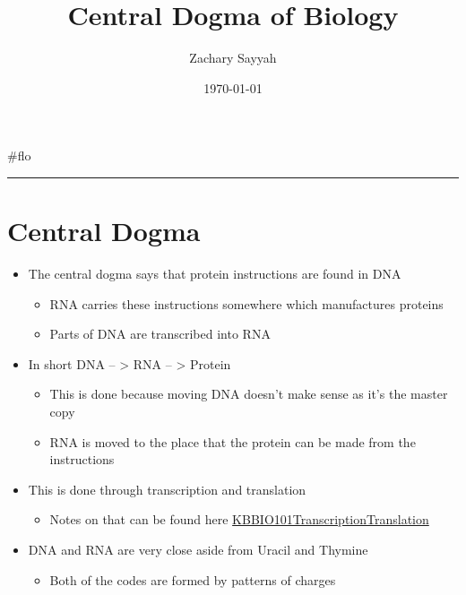 \documentclass[letterpaper]{article}
\author{Zachary Sayyah}
\date{\today}
\title{Central Dogma of Biology}
\renewcommand\maketitle{}
\begin{document}
\maketitle
\#flo

\noindent\rule{\textwidth}{0.5pt}

\section{Central Dogma}
\label{sec:orgae98e0f}
\begin{itemize}
\item The central dogma says that protein instructions are found in DNA

\begin{itemize}
\item RNA carries these instructions somewhere which manufactures proteins
\item Parts of DNA are transcribed into RNA
\end{itemize}

\item In short DNA -- > RNA -- > Protein

\begin{itemize}
\item This is done because moving DNA doesn't make sense as it's the
master copy
\item RNA is moved to the place that the protein can be made from the
instructions
\end{itemize}

\item This is done through transcription and translation

\begin{itemize}
\item Notes on that can be found here
\href{KBBIO101TranscriptionTranslation.org}{KBBIO101TranscriptionTranslation}
\end{itemize}

\item DNA and RNA are very close aside from Uracil and Thymine

\begin{itemize}
\item Both of the codes are formed by patterns of charges
\end{itemize}
\end{itemize}
\end{document}
